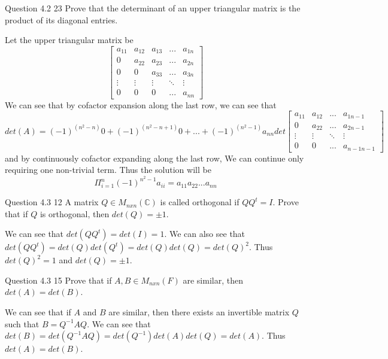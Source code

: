 \documentclass[answers,12pt,addpoints]{exam}
\begin{document}
\begin{questions}
\begin{solution}
    \end{solution}
    \item Question 4.2 23
    Prove that the determinant of an upper triangular matrix is the product of its diagonal entries.
    \begin{solution}
        Let the upper triangular matrix be 
        $$ \begin{bmatrix}
            a_{11} & a_{12} & a_{13} & ... & a_{1n} \\
            0 & a_{22} & a_{23} & ... & a_{2n} \\
            0 & 0 & a_{33} & ... & a_{3n} \\
            \vdots & \vdots & \vdots & \ddots & \vdots \\
            0 & 0 & 0 & ... & a_{nn}
        \end{bmatrix}$$
        We can see that by cofactor expansion along the last row, we can see that
        $$det(A) = (-1)^{(n^2-n)} 0 + (-1)^{(n^2-n+1)} 0 + ... + (-1)^{(n^2-1)} a_{nn} det\begin{bmatrix}
            a_{11} & a_{12} & ... & a_{1n-1} \\
            0 & a_{22} & ... & a_{2n-1} \\
            \vdots & \vdots & \ddots & \vdots \\
            0 & 0 & ... & a_{n-1n-1}  
        \end{bmatrix}$$
        and by continuously cofactor expanding along the last row, We can continue only requiring one non-trivial term. Thus the solution will be $$ \Pi_{i=1}^{n} (-1)^{n^2-1}a_{ii} = a_{11}a_{22}...a_{nn}$$ 
    \end{solution}
    \item Question 4.3 12
    A matrix $Q \in M_{nxn}(\mathbb{C})$ is called orthogonal if $QQ^t = I$. Prove that if $Q$ is orthogonal, then $det(Q) = \pm 1$.
    \begin{solution}
        We can see that $det(QQ^t) = det(I) = 1$. We can also see that $det(QQ^t) = det(Q)det(Q^t) = det(Q)det(Q) = det(Q)^2$. Thus $det(Q)^2 = 1$ and $det(Q) = \pm 1$.
    \end{solution}
    \item Question 4.3 15
    Prove that if $A,B \in M_{nxn}(F)$ are similar, then $det(A) = det(B)$.
    \begin{solution}
        We can see that if $A$ and $B$ are similar, then there exists an invertible matrix $Q$ such that $B = Q^{-1}AQ$. We can see that $det(B) = det(Q^{-1}AQ) = det(Q^{-1})det(A)det(Q) = det(A)$. Thus $det(A) = det(B)$.

\end{solution}
\end{questions}
\end{document}
